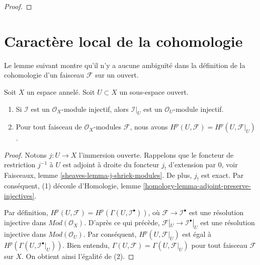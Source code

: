 \begin{proof}
\end{proof}













\section{Caractère local de la cohomologie}

\label{section-locality}

\noindent
Le lemme suivant montre qu'il n'y a aucune ambiguïté dans la définition de la cohomologie d'un faisceau $\mathcal{F}$ sur un ouvert.

\begin{lemma}

\label{lemma-cohomology-of-open}
Soit $X$ un espace annelé. Soit $U \subset X$ un sous-espace ouvert.
\begin{enumerate}
\item Si $\mathcal{I}$ est un $\mathcal{O}_X$-module injectif, alors $\mathcal{I}|_U$ est un $\mathcal{O}_U$-module injectif.
\item Pour tout faisceau de $\mathcal{O}_X$-modules $\mathcal{F}$, nous avons $H^p(U, \mathcal{F}) = H^p(U, \mathcal{F}|_U)$.
\end{enumerate}

\end{lemma}

\begin{proof}
Notons $j : U \to X$ l'immersion ouverte. Rappelons que le foncteur de restriction $j^{-1}$ à $U$ est adjoint à droite du foncteur $j_!$ d'extension par $0$, voir Faisceaux, lemme \ref{sheaves-lemma-j-shriek-modules}. De plus, $j_!$ est exact. Par conséquent, (1) découle d'Homologie, lemme \ref{homology-lemma-adjoint-preserve-injectives}.

\medskip\noindent
Par définition, $H^p(U, \mathcal{F}) = H^p(\Gamma(U, \mathcal{I}^\bullet))$, où $\mathcal{F} \to \mathcal{I}^\bullet$ est une résolution injective dans $\textit{Mod}(\mathcal{O}_X)$. D'après ce qui précède, $\mathcal{F}|_U \to \mathcal{I}^\bullet|_U$ est une résolution injective dans $\textit{Mod}(\mathcal{O}_U)$. Par conséquent, $H^p(U, \mathcal{F}|_U)$ est égal à $H^p(\Gamma(U, \mathcal{I}^\bullet|_U))$. Bien entendu, $\Gamma(U, \mathcal{F}) = \Gamma(U, \mathcal{F}|_U)$ pour tout faisceau $\mathcal{F}$ sur $X$. On obtient ainsi l'égalité de (2).
\end{proof}

